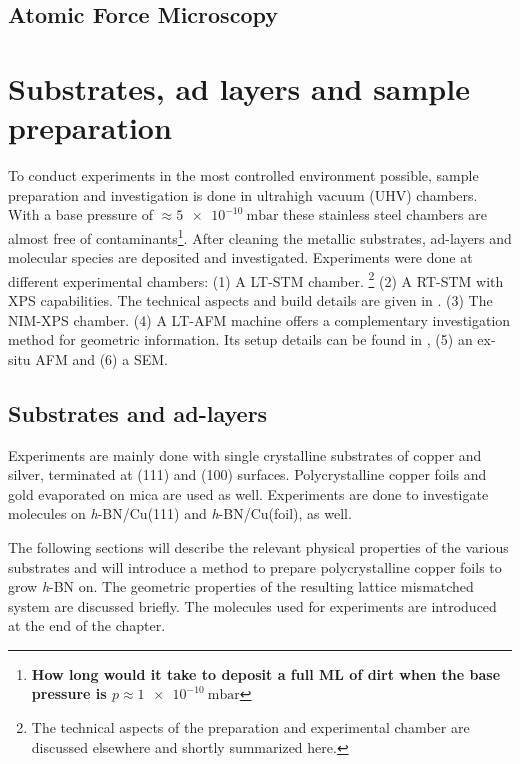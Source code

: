 \documentclass[
twoside,				%
BCOR=8mm,				%
headings=normal,		%
headsepline,			%
footsepline,			%
plainfootsepline,		%
]{scrbook}
\begin{document}
  \section{\textbf{A}tomic \textbf{F}orce \textbf{M}icroscopy}
	
\chapter{Substrates, ad layers and sample preparation}
To conduct experiments in the most controlled environment possible, sample preparation and investigation is done in ultrahigh vacuum (UHV) chambers. With a base pressure of $\approx \SI{5e-10}{\milli \bar}$ these stainless steel chambers are almost free of contaminants\footnote{\textbf{How long would it take to deposit a full ML of dirt when the base pressure is $p\approx \SI{1e-10}{\milli \bar}$}}. After cleaning the metallic substrates, ad-layers and molecular species are deposited and investigated. Experiments were done at different experimental chambers: (1) A LT-STM chamber. \footnote{The technical aspects of the preparation and experimental chamber are discussed elsewhere \cite{urgel_tendero_two-dimensional_2015, schwarz_assembly_2018, wiengarten_scanning_2015} and shortly summarized here.} (2) A RT-STM with XPS capabilities. The technical aspects and build details are given in \cite{schwarz_assembly_2018}. (3) The NIM-XPS chamber. 
(4) A LT-AFM machine offers a complementary investigation method for geometric information. Its setup details can be found in \cite{he_bottom-up_2017}, (5) an ex-situ AFM and (6) a SEM.


  \section{Substrates and ad-layers}
Experiments are mainly done with single crystalline substrates of copper and silver, terminated at (111) and (100) surfaces. Polycrystalline copper foils and gold evaporated on mica are used as well. Experiments are done to investigate molecules on \textit{h}-BN/Cu(111) and \textit{h}-BN/Cu(foil), as well.

The following sections will describe the relevant physical properties of the various substrates and will introduce a method to prepare polycrystalline copper foils to grow \textit{h}-BN on. The geometric properties of the resulting lattice mismatched system are discussed briefly. The molecules used for experiments are introduced at the end of the chapter.
\end{document}

